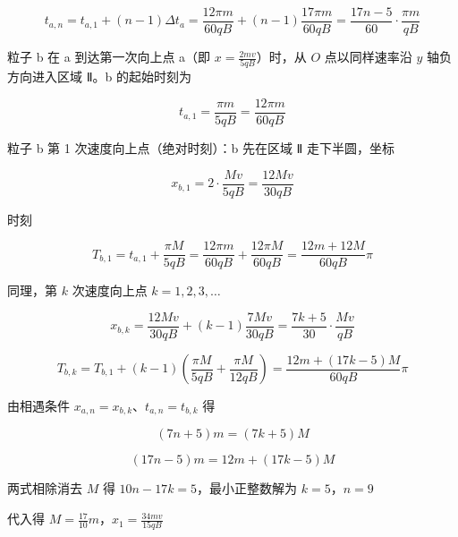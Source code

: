 \documentclass[\gkver]{gaokaozhenti}
\begin{document}
\begin{enumerate}
{\[ t_{a,n} = t_{a,1} + (n - 1)\Delta t_{a} = \frac{12\pi m}{60qB} + (n - 1)\frac{17\pi m}{60qB} = \frac{17n - 5}{60} \cdot \frac{\pi m}{qB} \]

粒子 b 在 a 到达第一次向上点 a（即 $x = \frac{2mv}{5qB}$）时，从 $O$ 点以同样速率沿 $y$ 轴负方向进入区域 Ⅱ。b 的起始时刻为

\[ t_{a,1} = \frac{\pi m}{5qB} = \frac{12\pi m}{60qB} \]

粒子 b 第 1 次速度向上点（绝对时刻）：b 先在区域 Ⅱ 走下半圆，坐标

\[ x_{b,1} = 2 \cdot \frac{Mv}{5qB} = \frac{12Mv}{30qB} \]

时刻

\[ T_{b,1} = t_{a,1} + \frac{\pi M}{5qB} = \frac{12\pi m}{60qB} + \frac{12\pi M}{60qB} = \frac{12m + 12M}{60qB}\pi \]

同理，第 $k$ 次速度向上点 $k = 1, 2, 3, \ldots$

\[ x_{b,k} = \frac{12Mv}{30qB} + (k - 1)\frac{7Mv}{30qB} = \frac{7k + 5}{30} \cdot \frac{Mv}{qB} \]

\[ T_{b,k} = T_{b,1} + (k - 1)\left(\frac{\pi M}{5qB} + \frac{\pi M}{12qB}\right) = \frac{12m + (17k - 5)M}{60qB}\pi \]

由相遇条件 $x_{a,n} = x_{b,k}$、$t_{a,n} = t_{b,k}$ 得

\[ (7n + 5)m = (7k + 5)M \]

\[ (17n - 5)m = 12m + (17k - 5)M \]

两式相除消去 $M$ 得 $10n - 17k = 5$，最小正整数解为 $k = 5$，$n = 9$

代入得 $M = \frac{17}{10}m$，$x_{1} = \frac{34mv}{15qB}$
}

\end{enumerate}
\end{document}
